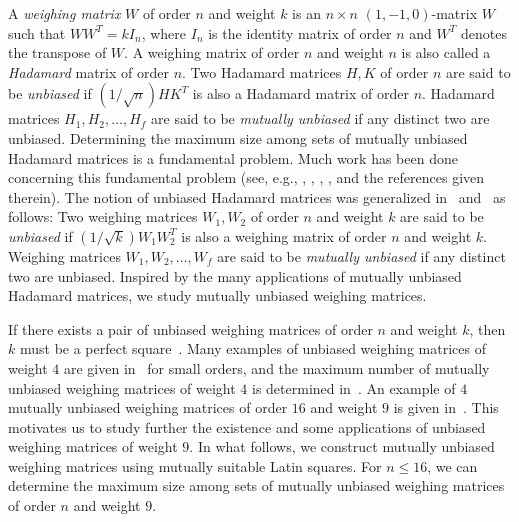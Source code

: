 \documentclass[12pt]{article}
\theoremstyle{remark}
\newcommand{\RR}{\mathbb{R}}
\begin{document}
A \emph{weighing matrix} $W$ of order $n$ and weight $k$ is an 
$n \times n$ $(1,-1,0)$-matrix $W$ such that $W W^T=kI_n$, where $I_n$ is 
the identity matrix of order $n$ and $W^T$ denotes the transpose of $W$. 
A weighing matrix of order $n$ and weight $n$ is also called a \emph{Hadamard} matrix of order $n$. 
Two Hadamard matrices $H,K$ of order $n$ are said to be
\emph{unbiased} if $(1/\sqrt{n})HK^{T}$ is also
a Hadamard matrix of order $n$.
Hadamard matrices $H_1,H_2,\ldots,H_f$ are said to be 
\emph{mutually unbiased} if any distinct two are unbiased.
Determining the
maximum size among sets of mutually unbiased Hadamard matrices is a fundamental problem.
Much work has been done concerning this fundamental problem (see, e.g., \cite{BKR}, \cite{HK}, \cite{HKO}, \cite{K11}, \cite{KSS} and the references given therein).
The notion of unbiased Hadamard matrices was generalized in~\cite{BKR} and~\cite{HKO}
as follows:
Two weighing matrices $W_1,W_2$ of order $n$ and weight $k$ are said to be 
\emph{unbiased} if $(1/\sqrt{k})W_1 W_2^{T}$ is also 
a weighing matrix of order $n$ and weight $k$.
Weighing matrices $W_1,W_2,\ldots,W_f$ are said to be 
\emph{mutually unbiased} if any distinct two are unbiased.
Inspired by the many applications of mutually unbiased Hadamard matrices,
we study mutually unbiased weighing matrices.

If there exists a pair of unbiased weighing matrices of order $n$ and weight $k$,
then $k$ must be a perfect square~\cite{BKR}.
Many examples of unbiased weighing matrices of weight $4$ are given in~\cite{BKR}
for small orders, and the maximum number of mutually unbiased weighing matrices of weight $4$ is determined in~\cite[Theorem~3.5]{NS}. 
An example of $4$ mutually unbiased weighing matrices of order $16$ and
weight $9$ is given in~\cite{HKO}.
This motivates us to study further the existence and some applications of unbiased weighing matrices of weight $9$.
In what follows, we construct mutually unbiased weighing matrices
using mutually suitable Latin squares.
For $n \le 16$, we can determine the maximum size among sets of mutually
unbiased weighing matrices of order $n$ and weight $9$.
\end{document}

